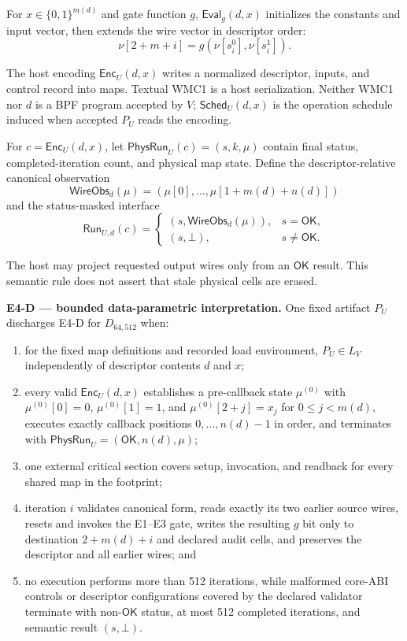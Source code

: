 \documentclass[conference]{IEEEtran}
\begin{document}
For $x\in\{0,1\}^{m(d)}$ and gate function $g$, $\mathsf{Eval}_g(d,x)$ initializes the constants and input vector, then extends the wire vector in descriptor order:
\begin{equation}
\nu[2+m+i]=g(\nu[s_i^0],\nu[s_i^1]).
\end{equation}

The host encoding $\mathsf{Enc}_U(d,x)$ writes a normalized descriptor, inputs, and control record into maps. Textual WMC1 is a host serialization. Neither WMC1 nor $d$ is a BPF program accepted by $V$; $\mathsf{Sched}_U(d,x)$ is the operation schedule induced when accepted $P_U$ reads the encoding.

For $c=\mathsf{Enc}_U(d,x)$, let $\mathsf{PhysRun}_U(c)=(s,k,\mu)$ contain final status, completed-iteration count, and physical map state. Define the descriptor-relative canonical observation
\begin{equation}
\mathsf{WireObs}_d(\mu)
=(\mu[0],\ldots,\mu[1+m(d)+n(d)])
\end{equation}
and the status-masked interface
\begin{equation}
\mathsf{Run}_{U,d}(c)=
\begin{cases}
(s,\mathsf{WireObs}_d(\mu)),&s=\mathsf{OK},\\
(s,\bot),&s\ne\mathsf{OK}.
\end{cases}
\end{equation}

The host may project requested output wires only from an $\mathsf{OK}$ result. This semantic rule does not assert that stale physical cells are erased.

\medskip
\noindent\textbf{E4-D --- bounded data-parametric interpretation.}
One fixed artifact $P_U$ discharges E4-D for $D_{64,512}$ when:

\begin{enumerate}
\item for the fixed map definitions and recorded load environment, $P_U\in L_V$ independently of descriptor contents $d$ and $x$;
\item every valid $\mathsf{Enc}_U(d,x)$ establishes a pre-callback state $\mu^{(0)}$ with $\mu^{(0)}[0]=0$, $\mu^{(0)}[1]=1$, and $\mu^{(0)}[2+j]=x_j$ for $0\le j<m(d)$, executes exactly callback positions $0,\ldots,n(d)-1$ in order, and terminates with $\mathsf{PhysRun}_U=(\mathsf{OK},n(d),\mu)$;
\item one external critical section covers setup, invocation, and readback for every shared map in the footprint;
\item iteration $i$ validates canonical form, reads exactly its two earlier source wires, resets and invokes the E1--E3 gate, writes the resulting $g$ bit only to destination $2+m(d)+i$ and declared audit cells, and preserves the descriptor and all earlier wires; and
\item no execution performs more than 512 iterations, while malformed core-ABI controls or descriptor configurations covered by the declared validator terminate with non-$\mathsf{OK}$ status, at most 512 completed iterations, and semantic result $(s,\bot)$.
\end{enumerate}
\end{document}

